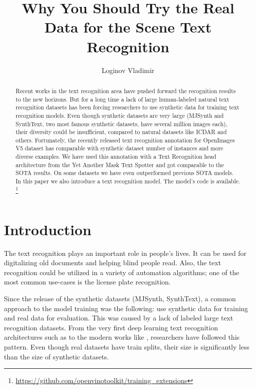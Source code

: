\documentclass[runningheads]{llncs}
\begin{document}
\title{Why You Should Try the Real Data for the Scene Text Recognition}
\author{Loginov Vladimir  }
\maketitle              \begin{abstract}
  Recent works in the text recognition area have pushed forward the recognition results
  to the new horizons. But for a long time a lack of large human-labeled natural text recognition
  datasets has been forcing researchers to use synthetic data for training
  text recognition models. Even though synthetic datasets are very large
  (MJSynth and SynthText, two most famous synthetic datasets, have several
  million images each), their diversity could be insufficient, compared to
  natural datasets like ICDAR and others. Fortunately, the recently released
  text recognition annotation for OpenImages V5 dataset has comparable with
  synthetic dataset number of instances and more diverse examples. We have
  used this annotation with a Text Recognition head architecture from the Yet
  Another Mask Text Spotter and got comparable to the SOTA results. On some
  datasets we have even outperformed previous SOTA models. In this paper we also
  introduce a text recognition model.
  The model's code is available.
  \footnote{\url{https://github.com/openvinotoolkit/training_extensions}}

\end{abstract}
\section{Introduction}
The text recognition plays an important role in people's lives.
It can be used for digitalizing old documents and helping blind people read.
Also, the text recognition could be utilized in a variety of automation algorithms;
one of the most common use-cases is the license plate recognition.


Since the release of the synthetic datasets (MJSynth\cite{Jaderberg14c},
SynthText\cite{Gupta16}), a common approach to the model training was the following:
use synthetic data for training and real data for evaluation. This was caused by a
lack of labeled large text recognition datasets. From the very first deep learning text
recognition architectures such as \cite{crnn} to the modern works like \cite{cstr},
\cite{cui2021representation} researchers have followed this pattern. Even though
real datasets have train splits, their size is significantly less than the size of
synthetic datasets.
\end{document}
